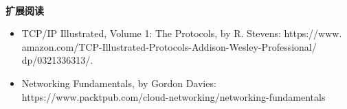 \noindent\textbf{}\ \par
\textbf{扩展阅读} \ \par
\begin{itemize}
	\item TCP/IP Illustrated, Volume 1: The Protocols, by R. Stevens:  https:/​/​www.​amazon.com/​TCP-​Illustrated-​Protocols-​Addison-​Wesley-​Professional/​dp/0321336313/​ .
	\item Networking Fundamentals, by Gordon Davies: https://www.packtpub.com/cloud-networking/networking-fundamentals
\end{itemize}

\newpage








































